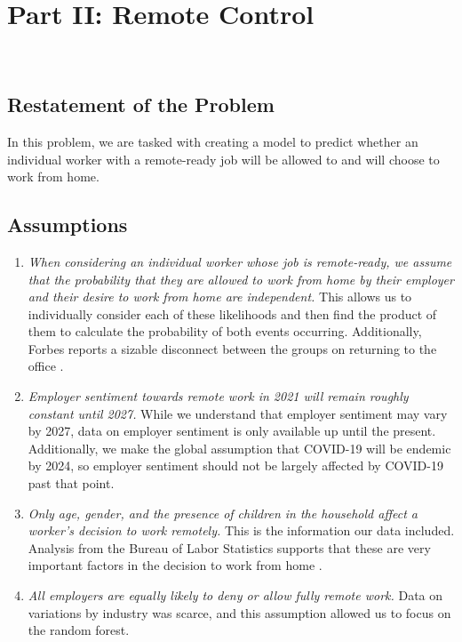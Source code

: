 \documentclass{article}
\begin{document}
\section{Part II: Remote Control}
\

\subsection{Restatement of the Problem}
In this problem, we are tasked with creating a model to predict whether an individual worker with a remote-ready job will be allowed to and will choose to work from home.
\

\subsection{Assumptions}
\begin{enumerate}
    \item \textit{When considering an individual worker whose job is remote-ready, we assume that the probability that they are allowed to work from home by their employer and their desire to work from home are independent.} This allows us to individually consider each of these likelihoods and then find the product of them to calculate the probability of both events occurring. Additionally, Forbes reports a sizable disconnect between the groups on returning to the office \cite{segal_2021}.
    \item \textit{Employer sentiment towards remote work in 2021 will remain roughly constant until 2027.} While we understand that employer sentiment may vary by 2027, data on employer sentiment is only available up until the present. Additionally, we make the global assumption that COVID-19 will be endemic by 2024, so employer sentiment should not be largely affected by COVID-19 past that point.
    \item \textit{Only age, gender, and the presence of children in the household affect a worker’s decision to work remotely.}  This is the information our data included. Analysis from the Bureau of Labor Statistics supports that these are very important factors in the decision to work from home \cite{usbls}.
    \item \textit{All employers are equally likely to deny or allow fully remote work.} Data on variations by industry was scarce, and this assumption allowed us to focus on the random forest.
\end{enumerate}
\
\end{document}
